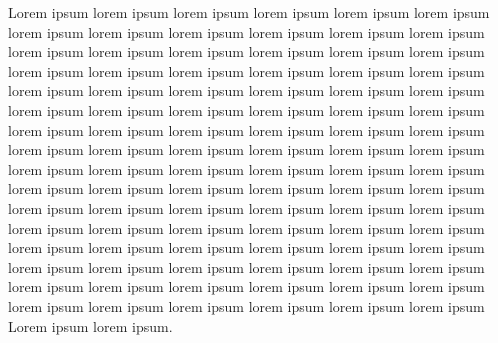 \documentclass[10pt,twocolumn]{article}
\begin{document}
Lorem ipsum lorem ipsum lorem ipsum lorem ipsum lorem ipsum lorem ipsum
lorem ipsum lorem ipsum lorem ipsum lorem ipsum lorem ipsum lorem ipsum
lorem ipsum lorem ipsum lorem ipsum lorem ipsum lorem ipsum lorem ipsum
lorem ipsum lorem ipsum lorem ipsum lorem ipsum lorem ipsum lorem ipsum
lorem ipsum lorem ipsum lorem ipsum lorem ipsum lorem ipsum lorem ipsum
lorem ipsum lorem ipsum lorem ipsum lorem ipsum lorem ipsum lorem ipsum
lorem ipsum lorem ipsum lorem ipsum lorem ipsum lorem ipsum lorem ipsum
lorem ipsum lorem ipsum lorem ipsum lorem ipsum lorem ipsum lorem ipsum
lorem ipsum lorem ipsum lorem ipsum lorem ipsum lorem ipsum lorem ipsum
lorem ipsum lorem ipsum lorem ipsum lorem ipsum lorem ipsum lorem ipsum
lorem ipsum lorem ipsum lorem ipsum lorem ipsum lorem ipsum lorem ipsum
lorem ipsum lorem ipsum lorem ipsum lorem ipsum lorem ipsum lorem ipsum
lorem ipsum lorem ipsum lorem ipsum lorem ipsum lorem ipsum lorem ipsum
lorem ipsum lorem ipsum lorem ipsum lorem ipsum lorem ipsum lorem ipsum
lorem ipsum lorem ipsum lorem ipsum lorem ipsum lorem ipsum lorem ipsum
lorem ipsum lorem ipsum lorem ipsum lorem ipsum lorem ipsum lorem ipsum
Lorem ipsum lorem ipsum.
\end{document}
